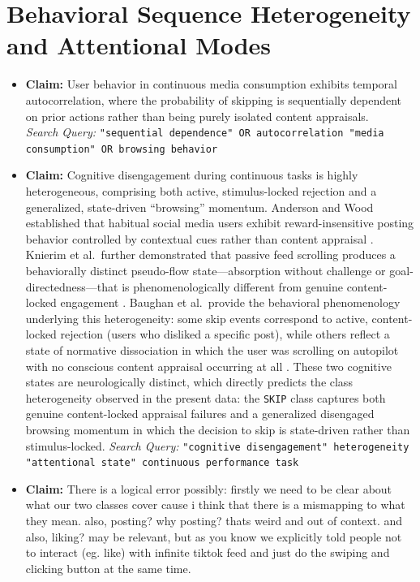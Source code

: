\documentclass[12pt,a4paper]{report}
\begin{document}
\section{Behavioral Sequence Heterogeneity and Attentional Modes}
\begin{itemize}
    \item \textbf{Claim:} User behavior in continuous media consumption exhibits temporal autocorrelation, where the probability of skipping is sequentially dependent on prior actions rather than being purely isolated content appraisals.\\
    \textit{Search Query:} \texttt{"sequential dependence" OR autocorrelation "media consumption" OR browsing behavior}
    
    \item \textbf{Claim:} Cognitive disengagement during continuous tasks is highly heterogeneous, comprising both active, stimulus-locked rejection and a generalized, state-driven ``browsing'' momentum. Anderson and Wood established that habitual social media users exhibit reward-insensitive posting behavior controlled by contextual cues rather than content appraisal \cite{anderson_social_2023}. Knierim et al.\ further demonstrated that passive feed scrolling produces a behaviorally distinct pseudo-flow state---absorption without challenge or goal-directedness---that is phenomenologically different from genuine content-locked engagement \cite{knierim_flow_2026}. Baughan et al.\ provide the behavioral phenomenology underlying this heterogeneity: some skip events correspond to active, content-locked rejection (users who disliked a specific post), while others reflect a state of normative dissociation in which the user was scrolling on autopilot with no conscious content appraisal occurring at all \cite{baughan_i_2022}. These two cognitive states are neurologically distinct, which directly predicts the class heterogeneity observed in the present data: the \texttt{SKIP} class captures both genuine content-locked appraisal failures and a generalized disengaged browsing momentum in which the decision to skip is state-driven rather than stimulus-locked.
    \textit{Search Query:} \texttt{"cognitive disengagement" heterogeneity "attentional state" continuous performance task}
    
    \item \textbf{Claim:} There is a logical error possibly: firstly we need to be clear about what our two classes cover cause i think that there is a mismapping to what they mean. also, posting? why posting? thats weird and out of context. and also, liking? may be relevant, but as you know we explicitly told people not to interact (eg. like) with infinite tiktok feed and just do the swiping and clicking button at the same time.
\end{itemize}
\fi
\end{document}
